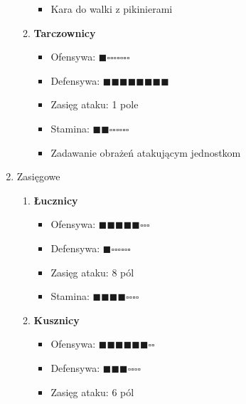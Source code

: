 \documentclass[oneside]{lmdEN}%
\begin{document}
\begin{enumerate}
\begin{enumerate}
\begin{itemize}
                        \item Kara do walki z pikinierami
                    \end{itemize}
              \item \textbf{Tarczownicy}
                    \begin{itemize}
                        \item Ofensywa: $\blacksquare\square\square\square\square\square\square\square$
                        \item Defensywa: $\blacksquare\blacksquare\blacksquare\blacksquare\blacksquare\blacksquare\blacksquare\blacksquare$
                        \item Zasięg ataku: 1 pole
                        \item Stamina: $\blacksquare\blacksquare\square\square\square\square\square\square$
                        \item Zadawanie obrażeń atakującym jednostkom
                    \end{itemize}
          \end{enumerate}
    \item Zasięgowe
          \begin{enumerate}
              \item \textbf{Łucznicy}
                    \begin{itemize}
                        \item Ofensywa: $\blacksquare\blacksquare\blacksquare\blacksquare\blacksquare\square\square\square$
                        \item Defensywa: $\blacksquare\square\square\square\square\square\square$
                        \item Zasięg ataku: 8 pól
                        \item Stamina: $\blacksquare\blacksquare\blacksquare\blacksquare\square\square\square\square$
                    \end{itemize}
              \item \textbf{Kusznicy}
                    \begin{itemize}
                        \item Ofensywa: $\blacksquare\blacksquare\blacksquare\blacksquare\blacksquare\blacksquare\square\square$
                        \item Defensywa: $\blacksquare\blacksquare\blacksquare\square\square\square\square$
                        \item Zasięg ataku: 6 pól

\end{itemize}
\end{enumerate}
\end{enumerate}
\end{document}
